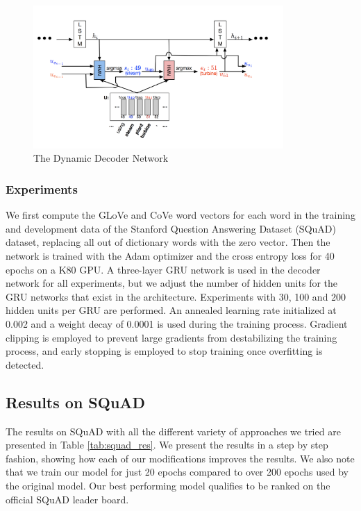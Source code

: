 \begin{figure}[h]
    \centering
    \includegraphics[width=0.85\textwidth]{images/decoder.png}
    \caption{The Dynamic Decoder Network \cite{DCN}}
    \label{im:dec}
\end{figure}

\subsubsection{Experiments}

We first compute the GLoVe and CoVe word vectors for each word in the training and development data of the Stanford Question Answering Dataset (SQuAD) dataset, replacing all out of dictionary words with the zero vector. Then the network is trained with the Adam optimizer and the cross entropy loss for 40 epochs on a K80 GPU. A three-layer GRU network is used in the decoder network for all experiments, but we adjust the number of hidden units for the GRU networks that exist in the architecture. Experiments with 30, 100 and 200 hidden units per GRU are performed. An annealed learning rate initialized at 0.002 and a weight decay of 0.0001 is used during the training process. Gradient clipping is employed to prevent large gradients from destabilizing the training process, and early stopping is employed to stop training once overfitting is detected.

\subsection{Results on SQuAD}
The results on SQuAD with all the different variety of approaches we tried are presented in Table \ref{tab:squad_res}. We present the results in a step by step fashion, showing how each of our modifications improves the results. We also note that we train our model for just 20 epochs compared to over 200 epochs used by the original model. Our best performing model qualifies to be ranked on the official SQuAD leader board.

